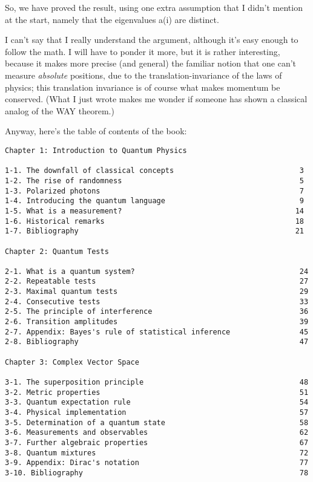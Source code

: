 So, we have proved the result, using one extra assumption that I didn't
mention at the start, namely that the eigenvalues a(i) are distinct.  

I can't say that I really understand the argument, although it's easy
enough to follow the math.  I will have to ponder it more, but it is
rather interesting, because it makes more precise (and general) the familiar
notion that one can't measure \emph{absolute} positions, due to the
translation-invariance of the laws of physics; this translation
invariance is of course what makes momentum be conserved.  (What I just
wrote makes me wonder if someone has shown a classical analog of the WAY
theorem.)

Anyway, here's the table of contents of the book:

\begin{verbatim}
Chapter 1: Introduction to Quantum Physics 
 
1-1. The downfall of classical concepts                             3 
1-2. The rise of randomness                                         5 
1-3. Polarized photons                                              7 
1-4. Introducing the quantum language                               9 
1-5. What is a measurement?                                        14 
1-6. Historical remarks                                            18 
1-7. Bibliography                                                  21
 
Chapter 2: Quantum Tests 
 
2-1. What is a quantum system?                                      24 
2-2. Repeatable tests                                               27 
2-3. Maximal quantum tests                                          29 
2-4. Consecutive tests                                              33 
2-5. The principle of interference                                  36 
2-6. Transition amplitudes                                          39 
2-7. Appendix: Bayes's rule of statistical inference                45 
2-8. Bibliography                                                   47
 
Chapter 3: Complex Vector Space 
 
3-1. The superposition principle                                    48 
3-2. Metric properties                                              51 
3-3. Quantum expectation rule                                       54 
3-4. Physical implementation                                        57 
3-5. Determination of a quantum state                               58 
3-6. Measurements and observables                                   62 
3-7. Further algebraic properties                                   67 
3-8. Quantum mixtures                                               72 
3-9. Appendix: Dirac's notation                                     77 
3-10. Bibliography                                                  78
     

\end{verbatim}
